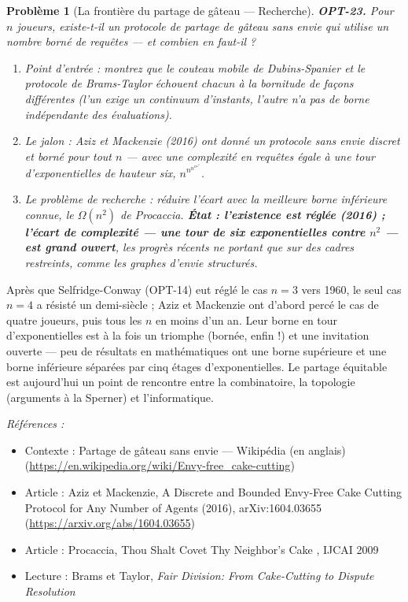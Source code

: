 \documentclass[11pt]{article}
\newtheorem{problem}{Problème}
\newenvironment{refs}{\par\small\noindent\emph{Références :}\begin{itemize}\setlength\itemsep{0pt}}{\end{itemize}\normalsize}
\begin{document}
\bigskip

\begin{problem}[{La frontière du partage de gâteau --- Recherche}]
\textbf{OPT-23.} Pour $n$ joueurs, existe-t-il un protocole de partage de gâteau sans envie qui utilise un nombre \textit{borné} de requêtes --- et combien en faut-il ?
\begin{enumerate}
\item[(a)] Point d'entrée : montrez que le couteau mobile de Dubins-Spanier et le protocole de Brams-Taylor échouent chacun à la bornitude de façons différentes (l'un exige un continuum d'instants, l'autre n'a pas de borne indépendante des évaluations).
\item[(b)] Le jalon : Aziz et Mackenzie (2016) ont donné un protocole sans envie discret et borné pour tout $n$ --- avec une complexité en requêtes égale à une tour d'exponentielles de hauteur six, $n^{n^{n^{n^{n^{n}}}}}$.
\item[(c)] Le problème de recherche : réduire l'écart avec la meilleure borne inférieure connue, le $\Omega(n^2)$ de Procaccia. \textbf{État : l'existence est réglée (2016) ; l'écart de complexité --- une tour de six exponentielles contre $n^2$ --- est grand ouvert}, les progrès récents ne portant que sur des cadres restreints, comme les graphes d'envie structurés.
\end{enumerate}

\end{problem}

\noindent Après que Selfridge-Conway (OPT-14) eut réglé le cas $n = 3$ vers 1960, le seul cas $n = 4$ a résisté un demi-siècle ; Aziz et Mackenzie ont d'abord percé le cas de quatre joueurs, puis tous les $n$ en moins d'un an. Leur borne en tour d'exponentielles est à la fois un triomphe (bornée, enfin !) et une invitation ouverte --- peu de résultats en mathématiques ont une borne supérieure et une borne inférieure séparées par cinq étages d'exponentielles. Le partage équitable est aujourd'hui un point de rencontre entre la combinatoire, la topologie (arguments à la Sperner) et l'informatique.

\begin{refs}
\item Contexte : Partage de gâteau sans envie --- Wikipédia (en anglais) (\url{https://en.wikipedia.org/wiki/Envy-free_cake-cutting})
\item Article : Aziz et Mackenzie, \og{} A Discrete and Bounded Envy-Free Cake Cutting Protocol for Any Number of Agents \fg{} (2016), arXiv:1604.03655 (\url{https://arxiv.org/abs/1604.03655})
\item Article : Procaccia, \og{} Thou Shalt Covet Thy Neighbor's Cake \fg{}, IJCAI 2009
\item Lecture : Brams et Taylor, \textit{Fair Division: From Cake-Cutting to Dispute Resolution}
\end{refs}
\end{document}
